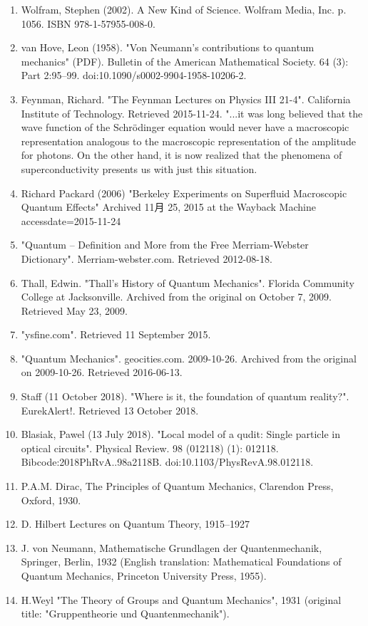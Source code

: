 \begin{enumerate}
\item Wolfram, Stephen (2002). A New Kind of Science. Wolfram Media, Inc. p. 1056. ISBN 978-1-57955-008-0.
\item van Hove, Leon (1958). "Von Neumann's contributions to quantum mechanics" (PDF). Bulletin of the American Mathematical Society. 64 (3): Part 2:95–99. doi:10.1090/s0002-9904-1958-10206-2.
\item Feynman, Richard. "The Feynman Lectures on Physics III 21-4". California Institute of Technology. Retrieved 2015-11-24. "...it was long believed that the wave function of the Schrödinger equation would never have a macroscopic representation analogous to the macroscopic representation of the amplitude for photons. On the other hand, it is now realized that the phenomena of superconductivity presents us with just this situation.
\item Richard Packard (2006) "Berkeley Experiments on Superfluid Macroscopic Quantum Effects" Archived 11月 25, 2015 at the Wayback Machine accessdate=2015-11-24
\item "Quantum – Definition and More from the Free Merriam-Webster Dictionary". Merriam-webster.com. Retrieved 2012-08-18.
\item Thall, Edwin. "Thall's History of Quantum Mechanics". Florida Community College at Jacksonville. Archived from the original on October 7, 2009. Retrieved May 23, 2009.
\item "ysfine.com". Retrieved 11 September 2015.
\item "Quantum Mechanics". geocities.com. 2009-10-26. Archived from the original on 2009-10-26. Retrieved 2016-06-13.
\item Staff (11 October 2018). "Where is it, the foundation of quantum reality?". EurekAlert!. Retrieved 13 October 2018.
\item Blasiak, Pawel (13 July 2018). "Local model of a qudit: Single particle in optical circuits". Physical Review. 98 (012118) (1): 012118. Bibcode:2018PhRvA..98a2118B. doi:10.1103/PhysRevA.98.012118.
\item P.A.M. Dirac, The Principles of Quantum Mechanics, Clarendon Press, Oxford, 1930.
\item D. Hilbert Lectures on Quantum Theory, 1915–1927
\item J. von Neumann, Mathematische Grundlagen der Quantenmechanik, Springer, Berlin, 1932 (English translation: Mathematical Foundations of Quantum Mechanics, Princeton University Press, 1955).
\item H.Weyl "The Theory of Groups and Quantum Mechanics", 1931 (original title: "Gruppentheorie und Quantenmechanik").

\end{enumerate}
